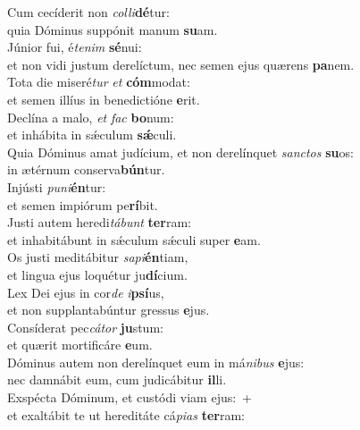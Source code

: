 \oddverse Cum cecíderit non \textit{col}\textit{li}\textbf{dé}tur:~\*\\
\oddverse quia Dóminus suppónit manum \textbf{su}am.\\
\evenverse Júnior fui, é\textit{te}\textit{nim} \textbf{sé}nui:~\*\\
\evenverse et non vidi justum derelíctum, nec semen ejus quærens \textbf{pa}nem.\\
\oddverse Tota die miseré\textit{tur} \textit{et} \textbf{cóm}modat:~\*\\
\oddverse et semen illíus in benedictióne \textbf{e}rit.\\
\evenverse Declína a malo, \textit{et} \textit{fac} \textbf{bo}num:~\*\\
\evenverse et inhábita in sǽculum \textbf{sǽ}culi.\\
\oddverse Quia Dóminus amat judícium, et non derelínquet \textit{san}\textit{ctos} \textbf{su}os:~\*\\
\oddverse in ætérnum conserva\textbf{bún}tur.\\
\evenverse Injústi \textit{pu}\textit{ni}\textbf{én}tur:~\*\\
\evenverse et semen impiórum pe\textbf{rí}bit.\\
\oddverse Justi autem heredi\textit{tá}\textit{bunt} \textbf{ter}ram:~\*\\
\oddverse et inhabitábunt in sǽculum sǽculi super \textbf{e}am.\\
\evenverse Os justi meditábitur \textit{sa}\textit{pi}\textbf{én}tiam,~\*\\
\evenverse et lingua ejus loquétur ju\textbf{dí}cium.\\
\oddverse Lex Dei ejus in cor\textit{de} \textit{i}\textbf{psí}us,~\*\\
\oddverse et non supplantabúntur gressus \textbf{e}jus.\\
\evenverse Consíderat pec\textit{cá}\textit{tor} \textbf{ju}stum:~\*\\
\evenverse et quærit mortificáre \textbf{e}um.\\
\oddverse Dóminus autem non derelínquet eum in má\textit{ni}\textit{bus} \textbf{e}jus:~\*\\
\oddverse nec damnábit eum, cum judicábitur \textbf{il}li.\\
\evenverse Exspécta Dóminum, et custódi viam ejus:~+\\
\evenverse  et exaltábit te ut hereditáte cá\textit{pi}\textit{as} \textbf{ter}ram:~\*\\
